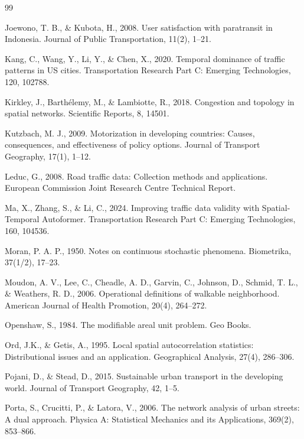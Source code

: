 \documentclass[12pt,a4paper]{article}
\begin{document}
\begin{thebibliography}{99}
\item Joewono, T. B., \& Kubota, H., 2008. User satisfaction with paratransit in Indonesia. Journal of Public Transportation, 11(2), 1--21.

\item Kang, C., Wang, Y., Li, Y., \& Chen, X., 2020. Temporal dominance of traffic patterns in US cities. Transportation Research Part C: Emerging Technologies, 120, 102788.

\item Kirkley, J., Barth\'{e}lemy, M., \& Lambiotte, R., 2018. Congestion and topology in spatial networks. Scientific Reports, 8, 14501.

\item Kutzbach, M. J., 2009. Motorization in developing countries: Causes, consequences, and effectiveness of policy options. Journal of Transport Geography, 17(1), 1--12.

\item Leduc, G., 2008. Road traffic data: Collection methods and applications. European Commission Joint Research Centre Technical Report.

\item Ma, X., Zhang, S., \& Li, C., 2024. Improving traffic data validity with Spatial-Temporal Autoformer. Transportation Research Part C: Emerging Technologies, 160, 104536.

\item Moran, P. A. P., 1950. Notes on continuous stochastic phenomena. Biometrika, 37(1/2), 17--23.

\item Moudon, A. V., Lee, C., Cheadle, A. D., Garvin, C., Johnson, D., Schmid, T. L., \& Weathers, R. D., 2006. Operational definitions of walkable neighborhood. American Journal of Health Promotion, 20(4), 264--272.

\item Openshaw, S., 1984. The modifiable areal unit problem. Geo Books.

\item Ord, J.K., \& Getis, A., 1995. Local spatial autocorrelation statistics: Distributional issues and an application. Geographical Analysis, 27(4), 286--306.

\item Pojani, D., \& Stead, D., 2015. Sustainable urban transport in the developing world. Journal of Transport Geography, 42, 1--5.

\item Porta, S., Crucitti, P., \& Latora, V., 2006. The network analysis of urban streets: A dual approach. Physica A: Statistical Mechanics and its Applications, 369(2), 853--866.


\end{thebibliography}
\end{document}

